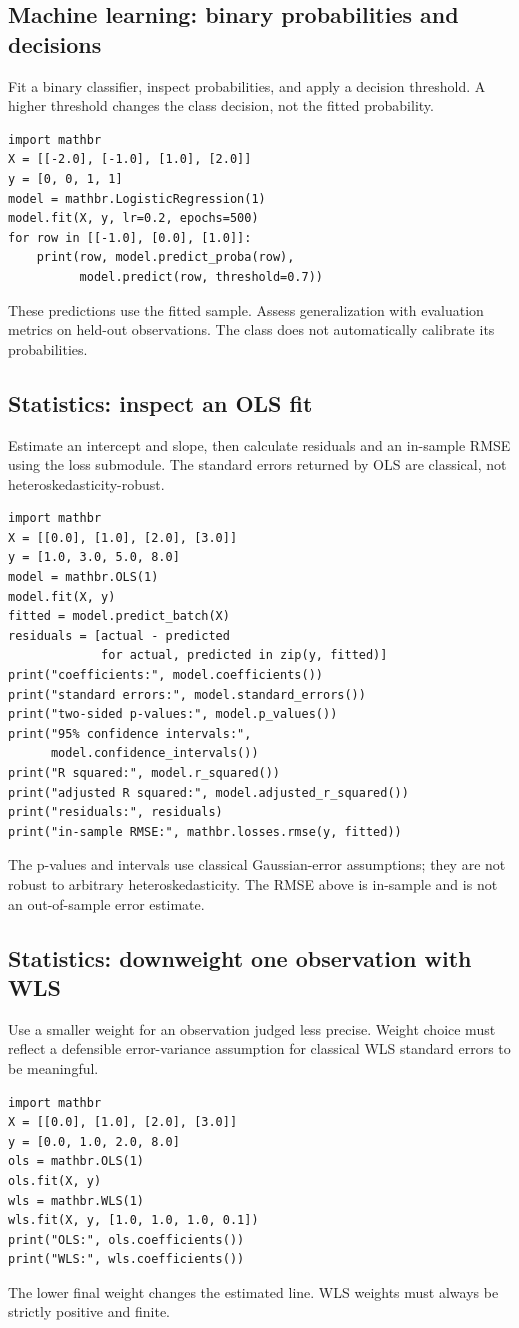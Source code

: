 \documentclass[11pt,a4paper]{article}
\begin{document}
\subsection{Machine learning: binary probabilities and decisions}
Fit a binary classifier, inspect probabilities, and apply a decision threshold. A higher threshold changes the class decision, not the fitted probability.
\begin{verbatim}
import mathbr
X = [[-2.0], [-1.0], [1.0], [2.0]]
y = [0, 0, 1, 1]
model = mathbr.LogisticRegression(1)
model.fit(X, y, lr=0.2, epochs=500)
for row in [[-1.0], [0.0], [1.0]]:
    print(row, model.predict_proba(row),
          model.predict(row, threshold=0.7))
\end{verbatim}
These predictions use the fitted sample. Assess generalization with evaluation metrics on held-out observations. The class does not automatically calibrate its probabilities.

\subsection{Statistics: inspect an OLS fit}
Estimate an intercept and slope, then calculate residuals and an in-sample RMSE using the loss submodule. The standard errors returned by OLS are classical, not heteroskedasticity-robust.
\begin{verbatim}
import mathbr
X = [[0.0], [1.0], [2.0], [3.0]]
y = [1.0, 3.0, 5.0, 8.0]
model = mathbr.OLS(1)
model.fit(X, y)
fitted = model.predict_batch(X)
residuals = [actual - predicted
             for actual, predicted in zip(y, fitted)]
print("coefficients:", model.coefficients())
print("standard errors:", model.standard_errors())
print("two-sided p-values:", model.p_values())
print("95% confidence intervals:",
      model.confidence_intervals())
print("R squared:", model.r_squared())
print("adjusted R squared:", model.adjusted_r_squared())
print("residuals:", residuals)
print("in-sample RMSE:", mathbr.losses.rmse(y, fitted))
\end{verbatim}
The p-values and intervals use classical Gaussian-error assumptions; they are not robust to arbitrary heteroskedasticity. The RMSE above is in-sample and is not an out-of-sample error estimate.

\subsection{Statistics: downweight one observation with WLS}
Use a smaller weight for an observation judged less precise. Weight choice must reflect a defensible error-variance assumption for classical WLS standard errors to be meaningful.
\begin{verbatim}
import mathbr
X = [[0.0], [1.0], [2.0], [3.0]]
y = [0.0, 1.0, 2.0, 8.0]
ols = mathbr.OLS(1)
ols.fit(X, y)
wls = mathbr.WLS(1)
wls.fit(X, y, [1.0, 1.0, 1.0, 0.1])
print("OLS:", ols.coefficients())
print("WLS:", wls.coefficients())
\end{verbatim}
The lower final weight changes the estimated line. WLS weights must always be strictly positive and finite.
\end{document}

